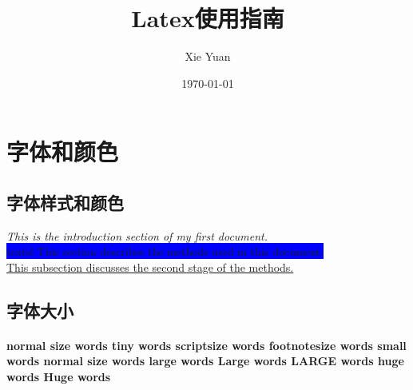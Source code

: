 \documentclass[a4paper,12pt]{article}
\begin{document}
\title{Latex使用指南}
\author{Xie Yuan}
\date{\today}
\maketitle %

\tableofcontents %


\listoftables %
\listoffigures %
\newpage %
 

    \section{字体和颜色}

        \subsection{字体样式和颜色}
    
        {\color{red}\textit{This is the introduction section of my first document.}}
        \\ \colorbox{blue}{\indent textsl{ This section describes the methods used in this document.}}
        \\ \underline{\indent This subsection discusses the second stage of the methods.}

        \subsection{字体大小}

        \paragraph{\indent normal size words {\tiny tiny words} {\scriptsize scriptsize words} 
        {\footnotesize footnotesize words} {\small small words} {\normalsize normal size words} 
        {\large large words} {\Large Large words} {\LARGE LARGE words} {\huge huge words} {\Huge Huge words}}
\end{document}
